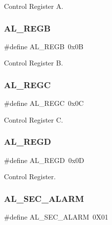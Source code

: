 Control Register A. 

\hypertarget{group___serial_ga404629cba65787d7e69df3b23d84aa2a}{}\label{group___serial_ga404629cba65787d7e69df3b23d84aa2a} 
\subsubsection{\texorpdfstring{A\+L\+\_\+\+R\+E\+GB}{AL\_REGB}}
{\footnotesize\ttfamily \#define A\+L\+\_\+\+R\+E\+GB~0x0B}



Control Register B. 

\hypertarget{group___serial_ga208d2a2e644c42d00b0a348b6635c4c5}{}\label{group___serial_ga208d2a2e644c42d00b0a348b6635c4c5} 
\subsubsection{\texorpdfstring{A\+L\+\_\+\+R\+E\+GC}{AL\_REGC}}
{\footnotesize\ttfamily \#define A\+L\+\_\+\+R\+E\+GC~0x0C}



Control Register C. 

\hypertarget{group___serial_gaa15a8cf99dbd75d8127ff660c71460f2}{}\label{group___serial_gaa15a8cf99dbd75d8127ff660c71460f2} 
\subsubsection{\texorpdfstring{A\+L\+\_\+\+R\+E\+GD}{AL\_REGD}}
{\footnotesize\ttfamily \#define A\+L\+\_\+\+R\+E\+GD~0x0D}



Control Register. 

\hypertarget{group___serial_ga9199a39ddfac98d39cf38c11dce52b67}{}\label{group___serial_ga9199a39ddfac98d39cf38c11dce52b67} 
\subsubsection{\texorpdfstring{A\+L\+\_\+\+S\+E\+C\+\_\+\+A\+L\+A\+RM}{AL\_SEC\_ALARM}}
{\footnotesize\ttfamily \#define A\+L\+\_\+\+S\+E\+C\+\_\+\+A\+L\+A\+RM~0\+X01}



